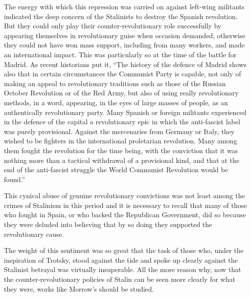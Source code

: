 The energy with which this repression was carried on against left-wing militants indicated the deep concern of the Stalinists to destroy the Spanish revolution. But they could only play their counter-revolutionary role successfully by appearing themselves in revolutionary guise when occasion demanded; otherwise they could not have won mass support, including from many workers, and made an international impact. This was particularly so at the time of the battle for Madrid. As recent historians put it, ``The history of the defence of Madrid shows also that in certain circumstances the Communist Party{\indexPCE} is capable, not only of making an appeal to revolutionary traditions such as those of the Russian October Revolution or of the Red Army, but also of using really revolutionary methods, in a word, appearing, in the eyes of large masses of people, as an authentically revolutionary party. Many Spanish or foreign militants experienced in the defence of the capital a revolutionary epic in which the anti-fascist label was purely provisional. Against the mercenaries from Germany or Italy, they wished to be fighters in the international proletarian revolution. Many among them fought the revolution for the time being, with the conviction that it was nothing more than a tactical withdrawal of a provisional kind, and that at the end of the anti-fascist struggle the World Communist Revolution would be found.''

This cynical abuse of genuine revolutionary convictions was not least among the crimes of Stalinism in this period and it is necessary to recall that many of those who fought in Spain, or who backed the Republican Government, did so because they were deluded into believing that by so doing they supported the revolutionary cause.

The weight of this sentiment was so great that the task of those who, under the inspiration of Trotsky, stood against the tide and spoke up clearly against the Stalinist betrayal was virtually insuperable. All the more reason why, now that the counter-revolutionary policies of Stalin can be seen more clearly for what they were, works like Morrow’s should be studied.

